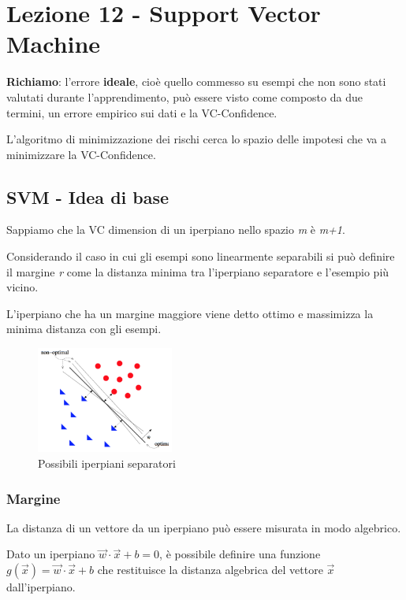 \section{Lezione 12 - Support Vector Machine}\label{lezione-12---support-vector-machine}

\textbf{Richiamo}: l'errore \textbf{ideale}, cioè quello commesso su esempi che
non sono stati valutati durante l'apprendimento, può essere visto come
composto da due termini, un errore empirico sui dati e la VC-Confidence.

L'algoritmo di minimizzazione dei rischi cerca lo spazio delle impotesi
che va a minimizzare la VC-Confidence.

\subsection{SVM - Idea di base}\label{svm---idea-di-base}

Sappiamo che la VC dimension di un iperpiano nello spazio \emph{m} è
\emph{m+1}.

Considerando il caso in cui gli esempi sono linearmente separabili si
può definire il margine \emph{r} come la distanza minima tra l'iperpiano separatore
e l'esempio più vicino.

L'iperpiano che ha un margine maggiore viene detto ottimo e massimizza
la minima distanza con gli esempi.

\begin{figure}[htbp]
\centering
\includegraphics[width=0.4\textwidth]{./notes/immagini/l12-space.png}
\caption{Possibili iperpiani separatori}
\end{figure}

\subsubsection{Margine}\label{margine}

La distanza di un vettore da un iperpiano può essere misurata in modo algebrico.

Dato un iperpiano $\vec{w} \cdot \vec{x} + b = 0$, è possibile definire una funzione $g(\vec{x}) = \vec{w} \cdot \vec{x} + b$ che restituisce la distanza algebrica del vettore $\vec{x}$ dall'iperpiano.

